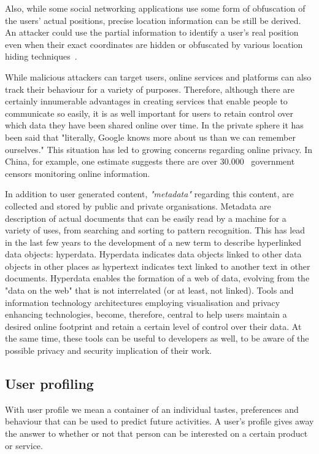 Also, while some social networking applications use some form of obfuscation of the users' actual positions, precise location information can be still be derived. An attacker 
could use the partial information to identify a user's real position even when their exact coordinates are hidden or obfuscated by  various  location  hiding  techniques~\cite{li2014all}.

While malicious attackers can target users, online services and platforms can also track their behaviour for a variety of purposes. Therefore, although there are certainly innumerable advantages in creating services that enable people to communicate so easily, it is as well important for users to retain control over which data they have been shared online over time. In the private sphere it has been said that "literally, Google knows more about us than we can remember ourselves." This situation has led to growing concerns regarding online privacy. In China, for example, one estimate suggests there are over 30.000~\cite{internet-freedom} government censors monitoring online information.

In addition to user generated content, \emph{"metadata"} regarding this content, are collected and stored by public and private organisations. Metadata are description of actual documents that can be easily read by a machine for a variety of uses, from searching and sorting to pattern recognition. This has lead in the last few years to the development of a new term to describe hyperlinked data objects: hyperdata. Hyperdata indicates data objects linked to other data objects in other places as hypertext indicates text linked to another text in other documents. Hyperdata enables the formation of a web of data, evolving from the "data on the web" that is not interrelated (or at least, not linked). Tools and information technology architectures employing visualisation and privacy enhancing technologies, become, therefore, central to help users maintain a desired online footprint and retain a certain level of control over their data. At the same time, these tools can be useful to developers as well, to be aware of the possible privacy and security implication of their work.

\subsection{User profiling}
\noindent
With user profile we mean a container of an individual tastes, preferences and behaviour that can be used to predict future activities. A user's profile gives away the answer to whether or not that person can be interested on a certain product or service.

